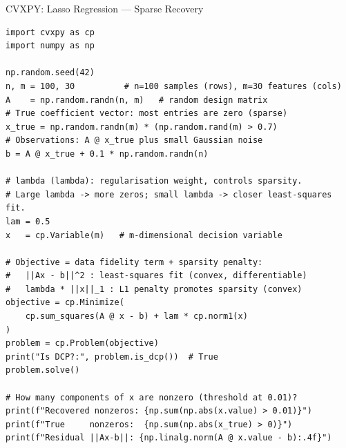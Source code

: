 \documentclass[aspectratio=169,10pt]{beamer}
\begin{document}
\begin{frame}[fragile]{CVXPY: Lasso Regression --- Sparse Recovery}
\begin{lstlisting}[caption={L1-regularised least squares (Lasso) for sparse coefficient recovery}]
import cvxpy as cp
import numpy as np

np.random.seed(42)
n, m = 100, 30          # n=100 samples (rows), m=30 features (cols)
A    = np.random.randn(n, m)   # random design matrix
# True coefficient vector: most entries are zero (sparse)
x_true = np.random.randn(m) * (np.random.rand(m) > 0.7)
# Observations: A @ x_true plus small Gaussian noise
b = A @ x_true + 0.1 * np.random.randn(n)

# lambda (lambda): regularisation weight, controls sparsity.
# Large lambda -> more zeros; small lambda -> closer least-squares fit.
lam = 0.5
x   = cp.Variable(m)   # m-dimensional decision variable

# Objective = data fidelity term + sparsity penalty:
#   ||Ax - b||^2 : least-squares fit (convex, differentiable)
#   lambda * ||x||_1 : L1 penalty promotes sparsity (convex)
objective = cp.Minimize(
    cp.sum_squares(A @ x - b) + lam * cp.norm1(x)
)
problem = cp.Problem(objective)
print("Is DCP?:", problem.is_dcp())  # True
problem.solve()

# How many components of x are nonzero (threshold at 0.01)?
print(f"Recovered nonzeros: {np.sum(np.abs(x.value) > 0.01)}")
print(f"True     nonzeros:  {np.sum(np.abs(x_true) > 0)}")
print(f"Residual ||Ax-b||: {np.linalg.norm(A @ x.value - b):.4f}")
\end{lstlisting}
\end{frame}
\end{document}
